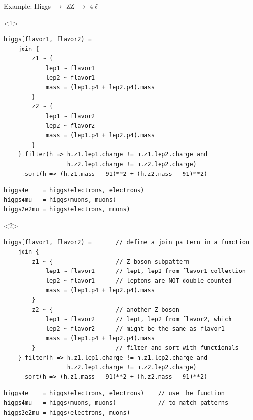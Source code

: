 \documentclass[aspectratio=169]{beamer}
\begin{document}
\begin{frame}[fragile]{Example: Higgs $\to$ ZZ $\to$ $4\ell$}
\small
\begin{onlyenv}<1>
\begin{verbatim}
higgs(flavor1, flavor2) =
    join {
        z1 ~ {
            lep1 ~ flavor1
            lep2 ~ flavor1
            mass = (lep1.p4 + lep2.p4).mass
        }
        z2 ~ {
            lep1 ~ flavor2
            lep2 ~ flavor2
            mass = (lep1.p4 + lep2.p4).mass
        }
    }.filter(h => h.z1.lep1.charge != h.z1.lep2.charge and
                  h.z2.lep1.charge != h.z2.lep2.charge)
     .sort(h => (h.z1.mass - 91)**2 + (h.z2.mass - 91)**2)
\end{verbatim}
\begin{verbatim}
higgs4e    = higgs(electrons, electrons)
higgs4mu   = higgs(muons, muons)
higgs2e2mu = higgs(electrons, muons)
\end{verbatim}
\end{onlyenv}
\begin{onlyenv}<2>
\begin{verbatim}
higgs(flavor1, flavor2) =       // define a join pattern in a function
    join {
        z1 ~ {                  // Z boson subpattern
            lep1 ~ flavor1      // lep1, lep2 from flavor1 collection
            lep2 ~ flavor1      // leptons are NOT double-counted
            mass = (lep1.p4 + lep2.p4).mass
        }
        z2 ~ {                  // another Z boson
            lep1 ~ flavor2      // lep1, lep2 from flavor2, which
            lep2 ~ flavor2      // might be the same as flavor1
            mass = (lep1.p4 + lep2.p4).mass
        }                       // filter and sort with functionals
    }.filter(h => h.z1.lep1.charge != h.z1.lep2.charge and
                  h.z2.lep1.charge != h.z2.lep2.charge)
     .sort(h => (h.z1.mass - 91)**2 + (h.z2.mass - 91)**2)
\end{verbatim}
\begin{verbatim}
higgs4e    = higgs(electrons, electrons)    // use the function
higgs4mu   = higgs(muons, muons)            // to match patterns
higgs2e2mu = higgs(electrons, muons)
\end{verbatim}
\end{onlyenv}
\end{frame}
\end{document}
